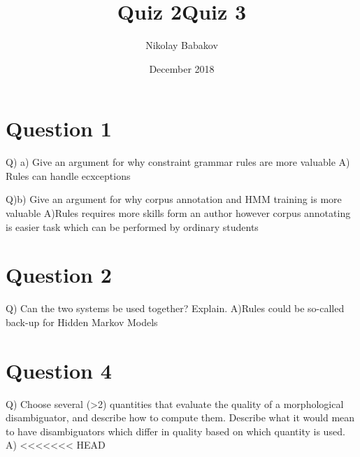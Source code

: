 \documentclass{article}
\title{Quiz 2}
\title{Quiz 3}
\author{Nikolay Babakov}
\date{December 2018}
\begin{document}
\maketitle

\section{Question 1}
Q) a) Give an argument for why constraint grammar rules are more valuable
A) Rules can handle ecxceptions

Q)b) Give an argument for why corpus annotation and HMM training is more valuable
A)Rules requires more skills form an author however corpus annotating is easier task which can be performed by ordinary students

\section{Question 2}
Q) Can the two systems be used together? Explain.
A)Rules could be so-called back-up for Hidden Markov Models

\section{Question 4}
Q) Choose several (>2) quantities that evaluate the quality of a morphological disambiguator, and describe how to compute them. Describe what it would mean to have disambiguators which differ in quality based on which quantity is used.
A) 
<<<<<<< HEAD
\end{document}
